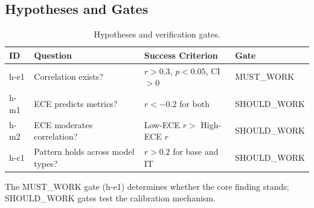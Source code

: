 \subsection{Hypotheses and Gates}

\begin{table}[h]
\centering
\begin{tabular}{llll}
\toprule
\textbf{ID} & \textbf{Question} & \textbf{Success Criterion} & \textbf{Gate} \\
\midrule
h-e1 & Correlation exists? & $r > 0.3$, $p < 0.05$, CI $> 0$ & MUST\_WORK \\
h-m1 & ECE predicts metrics? & $r < -0.2$ for both & SHOULD\_WORK \\
h-m2 & ECE moderates correlation? & Low-ECE $r >$ High-ECE $r$ & SHOULD\_WORK \\
h-c1 & Pattern holds across model types? & $r > 0.2$ for base and IT & SHOULD\_WORK \\
\bottomrule
\end{tabular}
\caption{Hypotheses and verification gates.}
\label{tab:gates}
\end{table}

The MUST\_WORK gate (h-e1) determines whether the core finding stands; SHOULD\_WORK gates test the calibration mechanism.
